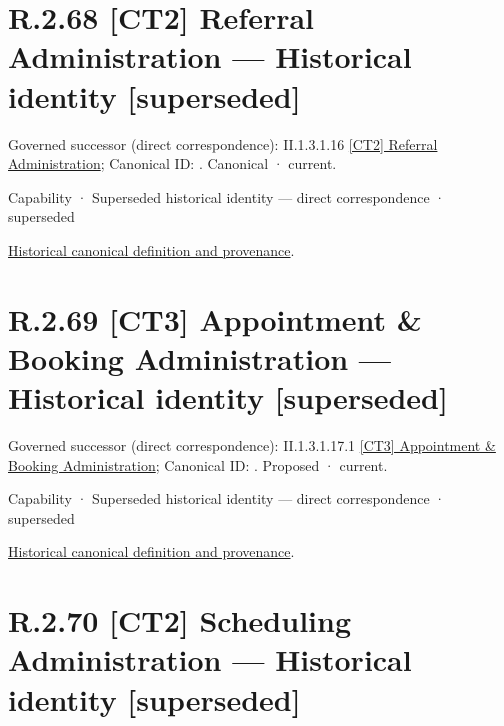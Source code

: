 \section*{R.2.68 [CT2] Referral Administration — Historical identity [superseded]}
\label{navigation:R.2.68}

{\small Governed successor (direct correspondence): II.1.3.1.16 \hyperref[element:ae0de25600ee416aa24d2a167b64f230]{[CT2] Referral Administration}; Canonical ID: \texttt{}. Canonical · current.}\par
\label{element:5b0ccf4b30054145952c298b348ed266}
{\small Capability · Superseded historical identity — direct correspondence · superseded}\par
\href{../../../../continuum/strategy/capability/5b0ccf4b30054145952c298b348ed266.md}{Historical canonical definition and provenance}.\par
\section*{R.2.69 [CT3] Appointment \& Booking Administration — Historical identity [superseded]}
\label{navigation:R.2.69}

{\small Governed successor (direct correspondence): II.1.3.1.17.1 \hyperref[element:7b3ba9bcac564dd4a7a08631581db2ca]{[CT3] Appointment \& Booking Administration}; Canonical ID: \texttt{}. Proposed · current.}\par
\label{element:cdc16dd0f84049f8af3f1ec76f1e1428}
{\small Capability · Superseded historical identity — direct correspondence · superseded}\par
\href{../../../../continuum/strategy/capability/cdc16dd0f84049f8af3f1ec76f1e1428.md}{Historical canonical definition and provenance}.\par
\section*{R.2.70 [CT2] Scheduling Administration — Historical identity [superseded]}
\label{navigation:R.2.70}


